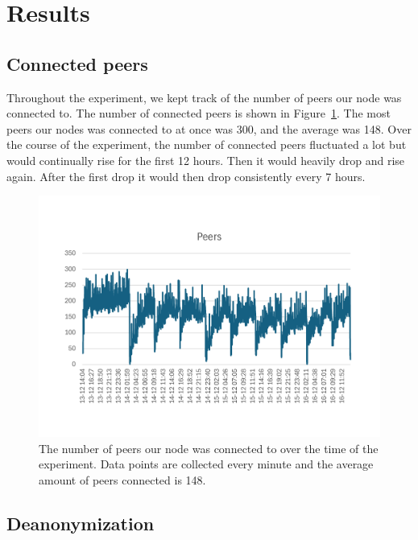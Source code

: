 \section{Results}\label{sec:results}

\subsection{Connected peers}\label{subsec:connected-peers}
Throughout the experiment, we kept track of the number of peers our node was connected to.
The number of connected peers is shown in Figure~\ref{fig:peersconnected}.
The most peers our nodes was connected to at once was 300, and the average was 148.
Over the course of the experiment, the number of connected peers fluctuated a lot but would continually rise for the first 12 hours.
Then it would heavily drop and rise again.
After the first drop it would then drop consistently every 7 hours.

\begin{figure}[!ht]
    \includegraphics[width=\linewidth]{figures/conPeer2}
    \caption{The number of peers our node was connected to over the time of the experiment.
    Data points are collected every minute and the average amount of peers connected is 148.}
    \label{fig:peersconnected}
\end{figure}

\subsection{Deanonymization}\label{subsec:deanonymization}


